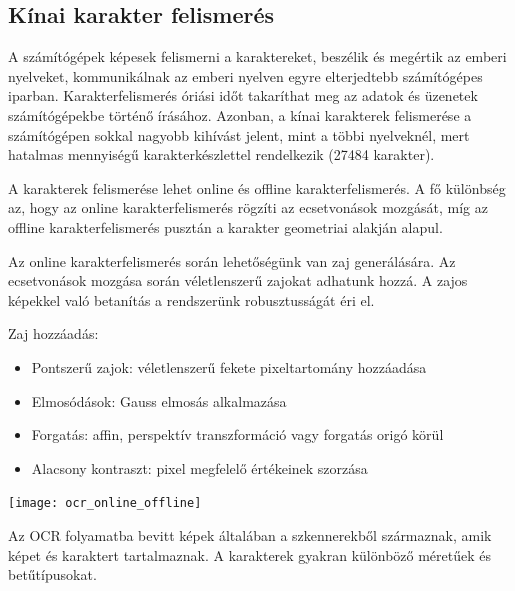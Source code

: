 \subsection{Kínai karakter felismerés}

A számítógépek képesek felismerni a karaktereket, beszélik és megértik az emberi nyelveket, kommunikálnak az emberi nyelven egyre elterjedtebb számítógépes iparban. Karakterfelismerés óriási időt takaríthat meg az adatok és üzenetek számítógépekbe történő írásához. Azonban, a kínai karakterek felismerése a számítógépen sokkal nagyobb kihívást jelent, mint a többi nyelveknél, mert hatalmas mennyiségű karakterkészlettel rendelkezik (27484 karakter).

A karakterek felismerése lehet online és offline karakterfelismerés. A fő különbség az, hogy az online karakterfelismerés rögzíti az ecsetvonások mozgását, míg az offline karakterfelismerés pusztán a karakter geometriai alakján alapul.

Az online karakterfelismerés során lehetőségünk van zaj generálására. Az ecsetvonások mozgása során véletlenszerű zajokat adhatunk hozzá. A zajos képekkel való betanítás a rendszerünk robusztusságát éri el.

Zaj hozzáadás:
\begin{itemize}
\item Pontszerű zajok: véletlenszerű fekete pixeltartomány hozzáadása
\item Elmosódások: Gauss elmosás alkalmazása
\item Forgatás: affin, perspektív transzformáció vagy forgatás origó körül 
\item Alacsony kontraszt: pixel megfelelő értékeinek szorzása
\end{itemize}

\begin{center}
\texttt{[image: ocr\_online\_offline]}
\end{center}

Az OCR folyamatba bevitt képek általában a szkennerekből származnak, amik képet és karaktert tartalmaznak. A karakterek gyakran különböző méretűek és betűtípusokat.

